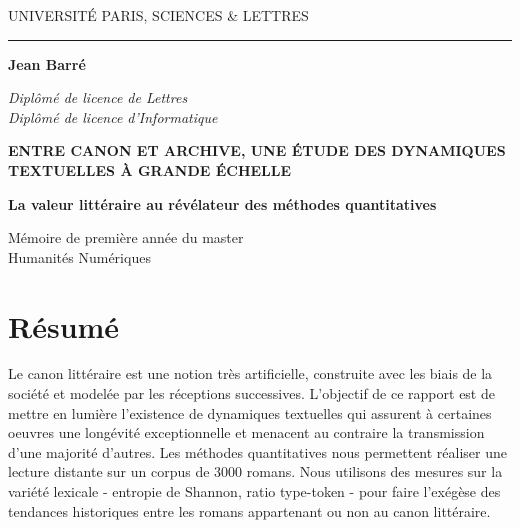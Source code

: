 \documentclass[a4paper,twoside,12pt]{book}
\begin{document}
\frontmatter

\begin{titlepage}
\begin{center}

\bigskip

\begin{large}
UNIVERSITÉ PARIS, SCIENCES \& LETTRES
\end{large}

\begin{center}\rule{2cm}{0.02cm}\end{center}

\bigskip
\bigskip
\bigskip
\begin{Large}
\textbf{Jean Barré}\\
\end{Large}
\begin{normalsize}
\textit{Diplômé de licence de Lettres}\\
\textit{Diplômé de licence d'Informatique}\\
\end{normalsize}

\bigskip
\bigskip
\bigskip

\begin{Huge}
\textbf{ENTRE CANON ET ARCHIVE, UNE ÉTUDE DES DYNAMIQUES TEXTUELLES À GRANDE ÉCHELLE}\\
\end{Huge}

\bigskip
\bigskip
\begin{LARGE}
\textbf{La valeur littéraire au révélateur des méthodes quantitatives}\\
\end{LARGE}

\bigskip
\bigskip
\bigskip
\vfill

\begin{large}
Mémoire de première année du master\\
\og Humanités Numériques \fg{} \\
\end{large}

\end{center}
\end{titlepage}


\section*{Résumé}
Le canon littéraire est une notion très artificielle, construite avec les biais de la société et modelée par les réceptions successives. L'objectif de ce rapport est de mettre en lumière l'existence de dynamiques textuelles qui assurent à certaines oeuvres une longévité exceptionnelle et menacent au contraire la transmission d'une majorité d'autres. Les méthodes quantitatives nous permettent réaliser une lecture distante sur un corpus de 3000 romans. Nous utilisons des mesures sur la variété lexicale - entropie de Shannon, ratio type-token - pour faire l'exégèse des tendances historiques entre les romans appartenant ou non au canon littéraire. 
\end{document}
